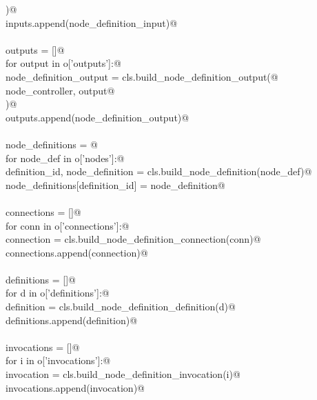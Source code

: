 \documentclass[
    a4paper,      %
    10pt,         %
    openright,    %
    notitlepage,  %
    parskip=half, %
]{scrreprt}       %
\theoremstyle{definition}                    %
\begin{document}
\begin{flushleft}
\begin{minipage}{\linewidth}
\begin{list}{}{}
\mbox{}\lstinline@        )@\\
\mbox{}\lstinline@        inputs.append(node_definition_input)@\\
\mbox{}\lstinline@@\\
\mbox{}\lstinline@    outputs = []@\\
\mbox{}\lstinline@    for output in o['outputs']:@\\
\mbox{}\lstinline@        node_definition_output = cls.build_node_definition_output(@\\
\mbox{}\lstinline@            node_controller, output@\\
\mbox{}\lstinline@        )@\\
\mbox{}\lstinline@        outputs.append(node_definition_output)@\\
\mbox{}\lstinline@@\\
\mbox{}\lstinline@    node_definitions = {}@\\
\mbox{}\lstinline@    for node_def in o['nodes']:@\\
\mbox{}\lstinline@        definition_id, node_definition = cls.build_node_definition(node_def)@\\
\mbox{}\lstinline@        node_definitions[definition_id] = node_definition@\\
\mbox{}\lstinline@@\\
\mbox{}\lstinline@    connections = []@\\
\mbox{}\lstinline@    for conn in o['connections']:@\\
\mbox{}\lstinline@        connection = cls.build_node_definition_connection(conn)@\\
\mbox{}\lstinline@        connections.append(connection)@\\
\mbox{}\lstinline@@\\
\mbox{}\lstinline@    definitions = []@\\
\mbox{}\lstinline@    for d in o['definitions']:@\\
\mbox{}\lstinline@        definition = cls.build_node_definition_definition(d)@\\
\mbox{}\lstinline@        definitions.append(definition)@\\
\mbox{}\lstinline@@\\
\mbox{}\lstinline@    invocations = []@\\
\mbox{}\lstinline@    for i in o['invocations']:@\\
\mbox{}\lstinline@        invocation = cls.build_node_definition_invocation(i)@\\
\mbox{}\lstinline@        invocations.append(invocation)@\\

\end{list}
\end{minipage}
\end{flushleft}
\end{document}
